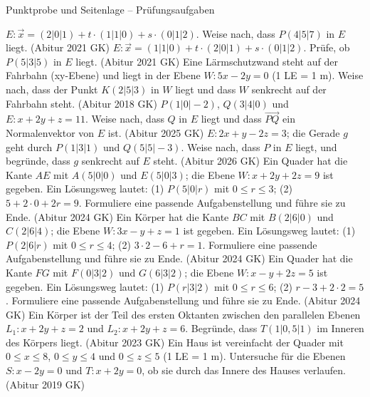 \begin{aufgabe}{Punktprobe und Seitenlage – Prüfungsaufgaben}
\begin{teile}
\teil $E: \vec{x} = (2 | 0 | 1) + t \cdot (1 | 1 | 0) + s \cdot (0 | 1 | 2)$. Weise nach, dass $P(4 | 5 | 7)$ in $E$ liegt. \hfill (Abitur 2021 GK)
\teil $E: \vec{x} = (1 | 1 | 0) + t \cdot (2 | 0 | 1) + s \cdot (0 | 1 | 2)$. Prüfe, ob $P(5 | 3 | 5)$ in $E$ liegt. \hfill (Abitur 2021 GK)
\teil Eine Lärmschutzwand steht auf der Fahrbahn (xy-Ebene) und liegt in der Ebene $W: 5x - 2y = 0$ (1 LE = 1 m). Weise nach, dass der Punkt $K(2 | 5 | 3)$ in $W$ liegt und dass $W$ senkrecht auf der Fahrbahn steht. \hfill (Abitur 2018 GK)
\teil $P(1 | 0 | -2)$, $Q(3 | 4 | 0)$ und $E: x + 2y + z = 11$. Weise nach, dass $Q$ in $E$ liegt und dass $\vec{PQ}$ ein Normalenvektor von $E$ ist. \hfill (Abitur 2025 GK)
\teil $E: 2x + y - 2z = 3$; die Gerade $g$ geht durch $P(1 | 3 | 1)$ und $Q(5 | 5 | -3)$. Weise nach, dass $P$ in $E$ liegt, und begründe, dass $g$ senkrecht auf $E$ steht. \hfill (Abitur 2026 GK)
\teil Ein Quader hat die Kante $AE$ mit $A(5 | 0 | 0)$ und $E(5 | 0 | 3)$; die Ebene $W: x + 2y + 2z = 9$ ist gegeben. Ein Lösungsweg lautet: (1) $P(5 | 0 | r)$ mit $0 \le r \le 3$; (2) $5 + 2 \cdot 0 + 2r = 9$. Formuliere eine passende Aufgabenstellung und führe sie zu Ende. \hfill (Abitur 2024 GK)
\teil Ein Körper hat die Kante $BC$ mit $B(2 | 6 | 0)$ und $C(2 | 6 | 4)$; die Ebene $W: 3x - y + z = 1$ ist gegeben. Ein Lösungsweg lautet: (1) $P(2 | 6 | r)$ mit $0 \le r \le 4$; (2) $3 \cdot 2 - 6 + r = 1$. Formuliere eine passende Aufgabenstellung und führe sie zu Ende. \hfill (Abitur 2024 GK)
\teil Ein Quader hat die Kante $FG$ mit $F(0 | 3 | 2)$ und $G(6 | 3 | 2)$; die Ebene $W: x - y + 2z = 5$ ist gegeben. Ein Lösungsweg lautet: (1) $P(r | 3 | 2)$ mit $0 \le r \le 6$; (2) $r - 3 + 2 \cdot 2 = 5$. Formuliere eine passende Aufgabenstellung und führe sie zu Ende. \hfill (Abitur 2024 GK)
\teil Ein Körper ist der Teil des ersten Oktanten zwischen den parallelen Ebenen $L_1: x + 2y + z = 2$ und $L_2: x + 2y + z = 6$. Begründe, dass $T(1 | 0{,}5 | 1)$ im Inneren des Körpers liegt. \hfill (Abitur 2023 GK)
\teil Ein Haus ist vereinfacht der Quader mit $0 \le x \le 8$, $0 \le y \le 4$ und $0 \le z \le 5$ (1 LE = 1 m). Untersuche für die Ebenen $S: x - 2y = 0$ und $T: x + 2y = 0$, ob sie durch das Innere des Hauses verlaufen. \hfill (Abitur 2019 GK)
\end{teile}
\end{aufgabe}

